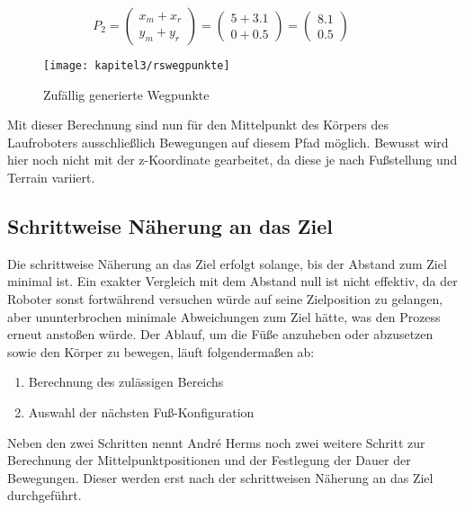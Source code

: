 \begin{equation}
  P_2=\left(\begin{array}{c} x_m + x_r \\ y_m + y_r \end{array}\right)=\left(\begin{array}{c} 5 + 3.1 \\ 0 + 0.5 \end{array}\right)=\left(\begin{array}{c} 8.1 \\ 0.5 \end{array}\right) \qquad
\label{RandomSamplingWegpunkteP2}
\end{equation}

\begin{figure}[t!]
  \centering
  \texttt{[image: kapitel3/rswegpunkte]}
  \caption{Zufällig generierte Wegpunkte}
  \label{Kap3:RSWegpunkte}
\end{figure}

Mit dieser Berechnung sind nun für den Mittelpunkt des Körpers des Laufroboters ausschließlich Bewegungen auf diesem Pfad möglich. Bewusst wird hier noch nicht mit der z-Koordinate gearbeitet, da diese je nach Fußstellung und Terrain variiert.

\subsection{Schrittweise Näherung an das Ziel}

Die schrittweise Näherung an das Ziel erfolgt solange, bis der Abstand zum Ziel minimal ist. Ein exakter Vergleich mit dem Abstand null ist nicht effektiv, da der Roboter sonst fortwährend versuchen würde auf seine Zielposition zu gelangen, aber ununterbrochen minimale Abweichungen zum Ziel hätte, was den Prozess erneut anstoßen würde. Der Ablauf, um die Füße anzuheben oder abzusetzen sowie den Körper zu bewegen, läuft folgendermaßen ab:
\begin{enumerate}
  \item Berechnung des zulässigen Bereichs
  \item Auswahl der nächsten Fuß-Konfiguration
\end{enumerate}

Neben den zwei Schritten nennt André Herms \autocite{herms2004} noch zwei weitere Schritt zur Berechnung der Mittelpunktpositionen und der Festlegung der Dauer der Bewegungen. Dieser werden erst nach der schrittweisen Näherung an das Ziel durchgeführt.

